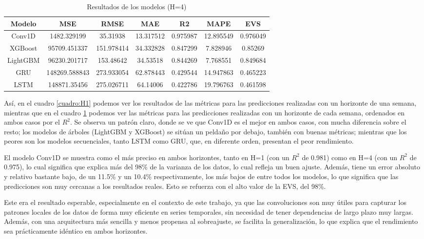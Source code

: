 \documentclass[a4paper,onecolumn]{extarticle}
\begin{document}
\begin{sloppypar}
\begin{table}[h!]
\centering
\begin{tabular}{|c|c|c|c|c|c|c|}
\hline
\textbf{Modelo} & \textbf{MSE} & \textbf{RMSE} & \textbf{MAE} & \textbf{R2} & \textbf{MAPE} & \textbf{EVS} \\
\hline
Conv1D   &   1482.329199 &  35.31938  & 13.317512 & 0.975987 & 12.895549 & 0.976049 \\
XGBoost  &  95709.451337 & 151.978414 & 34.332828 & 0.847299 &  7.828946 & 0.85269  \\
LightGBM &  96230.201717 & 153.48642  & 34.53518  & 0.844269 &  7.768551 & 0.849684 \\
GRU      & 148269.588843 & 273.933054 & 62.878443 & 0.429544 & 14.947863 & 0.465223 \\
LSTM     & 148871.35456  & 275.026711 & 64.14006  & 0.422786 & 19.796763 & 0.461598 \\
\hline
\end{tabular}
\caption{Resultados de los modelos (H=4)} \label{cuadro:H4}
\end{table}

Así, en el cuadro \ref{cuadro:H1} podemos ver los resultados de las métricas para las predicciones realizadas con un horizonte de una semana, mientras que en el cuadro 
\ref{cuadro:H4} podemos ver las métricas para las predicciones realizadas con un horizonte de cada semana, ordenados en ambos casos por el $R^2$. Se observa un patrón claro, 
donde se ve que Conv1D es el mejor en ambos casos, con mucha diferencia sobre el resto; los modelos de árboles (LightGBM y XGBoost) se sitúan un peldaño por debajo, también con 
buenas métricas; mientras que los peores son los modelos secuenciales, tanto LSTM como GRU, que, en diferente orden, presentan el peor rendimiento.

El modelo Conv1D se muestra como el más preciso en ambos horizontes, tanto en H=1 (con un $R^2$ de 0.981) como en H=4 (con un $R^2$ de 0.975), lo cual significa que explica 
más del 98\% de la varianza de los datos, lo cual refleja un buen ajuste. Además, tiene un error absoluto y relativo bastante bajo, de un 11.5\% y un 10.4\% respectivamente, 
los más bajos de entre todos los modelos, lo que significa que las predicciones son muy cercanas a los resultados reales. Esto se refuerza con el alto valor de la EVS, del 
98\%. 

Este era el resultado esperable, especialmente en el contexto de este trabajo, ya que las convoluciones son muy útiles para capturar los patrones locales de los datos de forma 
muy eficiente en series temporales, sin necesidad de tener dependencias de largo plazo muy largas. Además, con una arquitectura más sencilla y menos propensa al sobreajuste, se
facilita la generalización, lo que explica que el rendimiento sea prácticamente idéntico en ambos horizontes.


\end{sloppypar}
\end{document}
